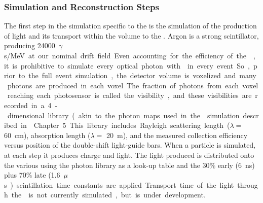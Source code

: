
\subsubsection{Simulation and Reconstruction Steps} 

The first step in the simulation specific to the  is the simulation of the production of light and its transport within the volume to the . Argon is a strong scintillator, producing \SI{24000}{$\gamma$s/MeV} at our nominal drift field. Even accounting for the efficiency of the , it is prohibitive to simulate every optical photon with  in every event. So, prior to the full event simulation, the detector volume is voxelized and many photons are produced in each voxel. The fraction of photons from each voxel reaching each photosensor is called the visibility, and these visibilities are recorded in a 4-dimensional library (akin to the photon maps used in the  simulation described in \voltitledp~Chapter~5.
This library includes Rayleigh scattering length ($\lambda=$ \SI{60}{cm}\cite{Grace:2015yta}), absorption length ($\lambda=$ \SI{20}{m}), and the measured collection efficiency versus position of the double-shift light-guide bars. When a particle is simulated, at each step it produces charge and light. The light produced is distributed onto the various  using the photon library as a look-up table and the 30\% early (\SI{6}{ns}) plus 70\% late (\SI{1.6}{$\mu$s}) scintillation time constants are applied. Transport time of the light through the \lar is not currently simulated, but is under development.


